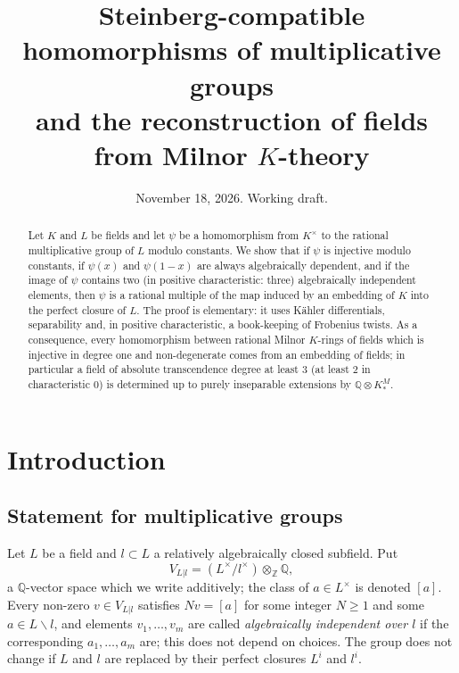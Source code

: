 \documentclass[11pt]{amsart}
\title[Milnor $K$-theory and field embeddings]{Steinberg-compatible homomorphisms of multiplicative groups\\ and the reconstruction of fields from Milnor $K$-theory}
\date{November 18, 2026. Working draft.}
\theoremstyle{definition}
\theoremstyle{remark}
\newcommand{\ZZ}{\mathbb{Z}}
\newcommand{\QQ}{\mathbb{Q}}
\newcommand{\sm}{\smallsetminus}
\newcommand{\KM}{K^{M}}
\begin{document}
\begin{abstract}
Let $K$ and $L$ be fields and let $\psi$ be a homomorphism from $K^\times$ to the rational multiplicative group of $L$ modulo constants.
We show that if $\psi$ is injective modulo constants, if $\psi(x)$ and $\psi(1-x)$ are always algebraically dependent, and if the image of $\psi$ contains
two (in positive characteristic: three) algebraically independent elements, then $\psi$ is a rational multiple of the map induced by an embedding of $K$ into the
perfect closure of $L$. The proof is elementary: it uses K\"ahler differentials, separability and, in positive characteristic, a book-keeping of Frobenius twists.
As a consequence, every homomorphism between rational Milnor $K$-rings of fields which is injective in degree one and non-degenerate comes from an embedding of fields;
in particular a field of absolute transcendence degree at least $3$ (at least $2$ in characteristic $0$) is determined up to purely inseparable extensions by $\QQ\otimes\KM_*$.
\end{abstract}

\maketitle
\setcounter{tocdepth}{1}
\tableofcontents

\section{Introduction}

\subsection{Statement for multiplicative groups}
Let $L$ be a field and $l\subset L$ a relatively algebraically closed subfield. Put
\[ V_{L|l}=(L^\times/l^\times)\otimes_\ZZ\QQ , \]
a $\QQ$-vector space which we write additively; the class of $a\in L^\times$ is denoted $[a]$.
Every non-zero $v\in V_{L|l}$ satisfies $Nv=[a]$ for some integer $N\ge1$ and some $a\in L\sm l$, and elements $v_1,\dots,v_m$ are called \emph{algebraically independent over $l$}
if the corresponding $a_1,\dots,a_m$ are; this does not depend on choices. The group does not change if $L$ and $l$ are replaced by their perfect closures $L^i$ and $l^i$.
\end{document}
